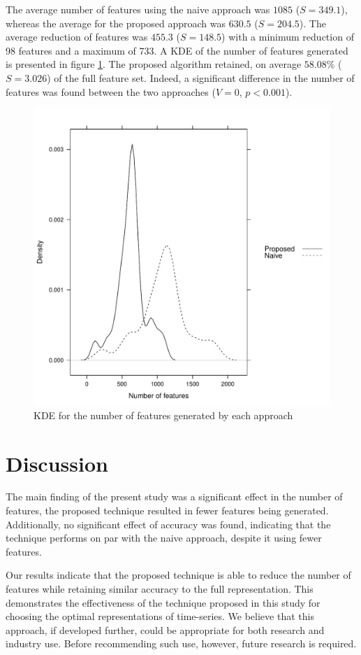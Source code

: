 \documentclass[conference]{IEEEtran}
\begin{document}
The average number of features using the naive approach was $1085$ ($S = 349.1$), whereas the average for the proposed approach was $630.5$ ($S = 204.5$). The average reduction of features was $455.3$ ($S = 148.5$) with a minimum reduction of 98 features and a maximum of 733. A KDE of the number of features generated is presented in figure \ref{fig_features_kde}. The proposed algorithm retained, on average $58.08\%$ ($S = 3.026$) of the full feature set. Indeed, a significant difference in the number of features was found between the two approaches ($V = 0$, $p < 0.001$).

\begin{figure}[!t]
\centering
\includegraphics[width=.45\textwidth]{features_kde.pdf}
\caption{KDE for the number of features generated by each approach}
\label{fig_features_kde}
\end{figure}

\section{Discussion}

The main finding of the present study was a significant effect in the number of features, the proposed technique resulted in fewer features being generated. Additionally, no significant effect of accuracy was found, indicating that the technique performs on par with the naive approach, despite it using fewer features.

Our results indicate that the proposed technique is able to reduce the number of features while retaining similar accuracy to the full representation. This demonstrates the effectiveness of the technique proposed in this study for choosing the optimal representations of time-series. We believe that this approach, if developed further, could be appropriate for both research and industry use. Before recommending such use, however, future research is required.
\end{document}
